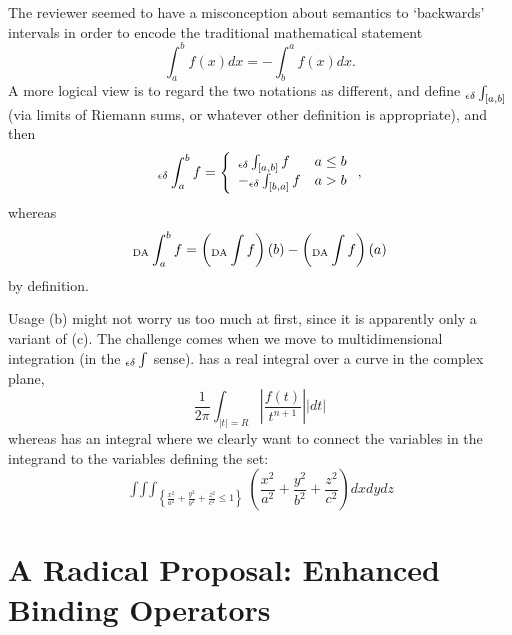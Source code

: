 \documentclass{llncs}
\begin{document}
\begin{newpart}{The reviewer seemed to have a misconception about semantics}
to `backwards' intervals in order to encode the traditional mathematical statement
\begin{equation}\label{eq:backint}
\int_a^bf(x) dx=-\int_b^af(x) dx.
\end{equation}
A more logical view is to regard the two notations as different, and define
${}_{\epsilon\delta}\int_{[a,b]}$ (via limits of Riemann sums, or whatever other definition is
appropriate), and then
\begin{equation}\label{eq:backinted}
\Ied_a^bf=%
\left\{
\begin{array}{lr}
\Ied_{[a,b]}f & a\le b\\
-\Ied_{[b,a]}f & a>b\\
\end{array}\right.,
\end{equation}
whereas 
\begin{equation}\label{eq:backintda} 
{}_{\rm DA}\int_a^bf = \left({}_{\rm DA}\int f\right)(b)-\left({}_{\rm DA}\int f\right)(a)
\end{equation}
by definition.

Usage (b) might not worry us too much at first, since it is apparently only a variant of
(c). The challenge comes when we move to multidimensional integration (in the ${}_{\epsilon\delta}\int$
sense).  \cite[p. 189]{BorweinErdelyi1995} has a real integral over a curve in the complex
plane,
\begin{equation}\label{eq:bounds2} 
\frac1{2\pi}\int_{|t|=R}\left|\frac{f(t)}{t^{n+1}}\right| |dt|
\end{equation}
whereas \cite[p. 413, exercise 4, slightly reformulated]{Apostol1967} has an integral
where we clearly want to connect the variables in the integrand to the variables defining
the set:
\begin{equation}\label{eq:bounds1} 
\mathop{\int\int\int}_{\left\{\frac{x^2}{a^2}+\frac{y^2}{b^2}+\frac{z^2}{c^2}\le1\right\}}
\left(\frac{x^2}{a^2}+\frac{y^2}{b^2}+\frac{z^2}{c^2}\right)dxdydz
\end{equation}

\section{A Radical Proposal: Enhanced Binding Operators}\label{sec:proposal}


\end{newpart}
\end{document}
